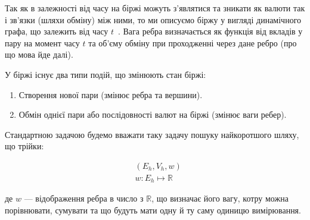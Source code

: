 \documentclass[../index.tex]{subfiles}
\begin{document}
Так як в залежності від часу на біржі можуть з'являтися та зникати як валюти так
і зв'язки (шляхи обміну) між ними, то ми описуємо біржу у вигляді динамічного
графа, що залежить від часу \(t\)~\cite{siljak}. Вага ребра визначається як
функція від вкладів у пару на момент часу \(t\) та об'єму обміну при проходженні
через дане ребро (про що мова йде далі).

У біржі існує два типи подій, що змінюють стан біржі:

\begin{enumerate}
  \item Створення нової пари (змінює ребра та вершини).
  \item Обмін однієї пари або послідовності валют на біржі (змінює ваги ребер).
\end{enumerate}

Стандартною задачою будемо вважати таку задачу пошуку найкоротшого шляху, що
трійки:

\begin{equation*}
  \begin{aligned}
	&(E_{h}, V_{h}, w) \\
	& w : E_{h} \mapsto \mathbb{R}
  \end{aligned}
\end{equation*}

де $w$ --- відображення ребра в число з $\mathbb{R}$, що визначає його вагу, котру
можна порівнювати, сумувати та що будуть мати одну й ту саму одиницю
вимірювання.
\end{document}
